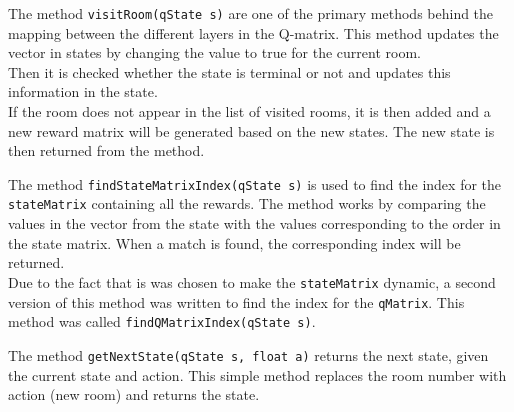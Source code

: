 \documentclass[../Head/Main.tex]{subfiles}
\begin{document}
The method \texttt{visitRoom(qState s)} are one of the primary methods behind the mapping between the different layers in the Q-matrix. This method updates the vector in states by changing the value to true for the current room.\\
Then it is checked whether the state is terminal or not and updates this information in the state.\\
If the room does not appear in the list of visited rooms, it is then added and a new reward matrix will be generated based on the new states. The new state is then returned from the method.\par 

The method \texttt{findStateMatrixIndex(qState s)} is used to find the index for the \texttt{stateMatrix} containing all the rewards. The method works by comparing the values in the vector from the state with the values corresponding to the order in the state matrix. When a match is found, the corresponding index will be returned.\\
Due to the fact that is was chosen to make the \texttt{stateMatrix} dynamic, a second version of this method was written to find the index for the \texttt{qMatrix}. This method was called \texttt{findQMatrixIndex(qState s)}.\par 

The method \texttt{getNextState(qState s, float a)} returns the next state, given the current state and action. This simple method replaces the room number with action (new room) and returns the state.\par 
\end{document}
